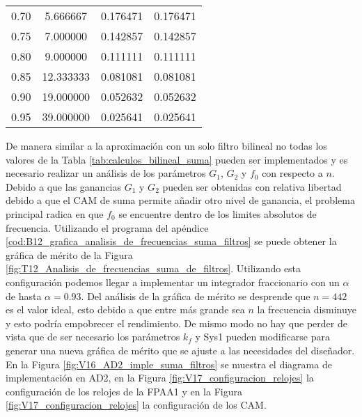 \begin{table}[!hbp]
\begin{tabular}{cccc}
			0.70 & 5.666667 & 0.176471 & 0.176471 \\ 
			                                  
			0.75 & 7.000000 & 0.142857 & 0.142857 \\ 
			                                   
			0.80 & 9.000000 & 0.111111 & 0.111111 \\ 
			                                 
			0.85 & 12.333333 & 0.081081 & 0.081081 \\
			                                  
			0.90 & 19.000000 & 0.052632 & 0.052632 \\
			                                  
			0.95 & 39.000000 & 0.025641 & 0.025641 \\
			\hline                                              
			\end{tabular}                                                                
	\end{table} 

	De manera similar a la aproximación con un solo filtro bilineal no todas los valores de la Tabla \ref{tab:calculos_bilineal_suma} pueden ser implementados y es necesario realizar un análisis de los parámetros $G_{1}$, $G_{2}$ y $f_{0}$ con respecto a $n$. Debido a que las ganancias $G_{1}$ y $G_{2}$ pueden ser obtenidas con relativa libertad debido a que el CAM de suma permite añadir otro nivel de ganancia, el problema principal radica en que $f_{0}$ se encuentre dentro de los limites absolutos de frecuencia. Utilizando el programa del apéndice \ref{cod:B12_grafica_analisis_de_frecuencias_suma_filtros} se puede obtener la gráfica de mérito de la Figura \ref{fig:T12_Analisis_de_frecuencias_suma_de_filtros}. Utilizando esta configuración podemos llegar a implementar un integrador fraccionario con un $\alpha$ de hasta $\alpha = 0.93$. Del análisis de la gráfica de mérito se desprende que $n = 442$ es el valor ideal, esto debido a que entre más grande sea $n$ la frecuencia disminuye y esto podría empobrecer el rendimiento. De mismo modo no hay que perder de vista que de ser necesario los parámetros $k_{f}$ y Sys1 pueden modificarse para generar una nueva gráfica de mérito que se ajuste a las necesidades del diseñador. En la Figura  \ref{fig:V16_AD2_imple_suma_filtros} se muestra el diagrama de implementación en AD2, en la Figura \ref{fig:V17_configuracion_relojes} la configuración de los relojes de la FPAA1 y en la Figura \ref{fig:V17_configuracion_relojes} la configuración de los CAM.
	
